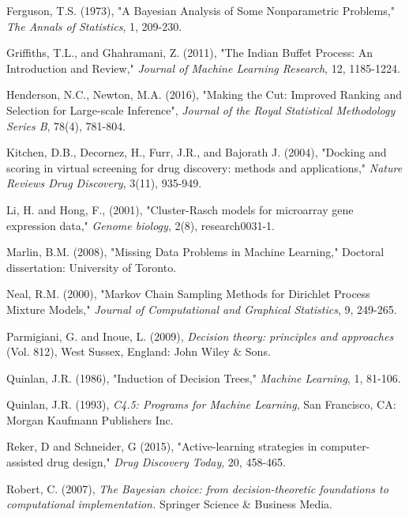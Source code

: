 \documentclass[12pt]{article}
\begin{document}
\begin{list}{}{}
\item Ferguson, T.S. (1973), "A Bayesian Analysis of Some Nonparametric Problems," {\em The Annals of Statistics}, 1, 209-230.

\item Griffiths, T.L., and Ghahramani, Z. (2011), "The Indian Buffet Process: An Introduction and Review," {\em Journal of Machine Learning Research}, 12, 1185-1224.

\item Henderson, N.C., Newton, M.A. (2016), "Making the Cut: Improved Ranking and Selection for Large-scale Inference", {\em Journal of the Royal Statistical Methodology Series B}, 78(4), 781-804.

\item Kitchen, D.B., Decornez, H., Furr, J.R., and  Bajorath J. (2004), "Docking and scoring in virtual screening for drug discovery: methods and applications," {\em Nature Reviews Drug Discovery}, 3(11), 935-949.

\item Li, H. and Hong, F., (2001), "Cluster-Rasch models for microarray gene expression data," {\em Genome biology}, 2(8), research0031-1.

\item Marlin, B.M. (2008), "Missing Data Problems in Machine Learning," Doctoral dissertation: University of Toronto.

\item Neal, R.M. (2000), "Markov Chain Sampling Methods for Dirichlet Process Mixture Models," {\em Journal of Computational and Graphical Statistics}, 9, 249-265.

\item Parmigiani, G. and Inoue, L. (2009), {\em Decision theory: principles and approaches} (Vol. 812), West Sussex, England: John Wiley \& Sons.

\item Quinlan, J.R. (1986), "Induction of Decision Trees," {\em Machine Learning}, 1, 81-106.

\item Quinlan, J.R. (1993), {\em C4.5: Programs for Machine Learning}, San Francisco, CA: Morgan Kaufmann Publishers Inc.

\item Reker, D and Schneider, G (2015), "Active-learning 
strategies in computer-assisted drug design," {\em Drug Discovery Today}, 20, 458-465.

\item Robert, C. (2007), {\em The Bayesian choice: from decision-theoretic foundations to computational implementation.} Springer Science \& Business Media.


\end{list}
\end{document}
